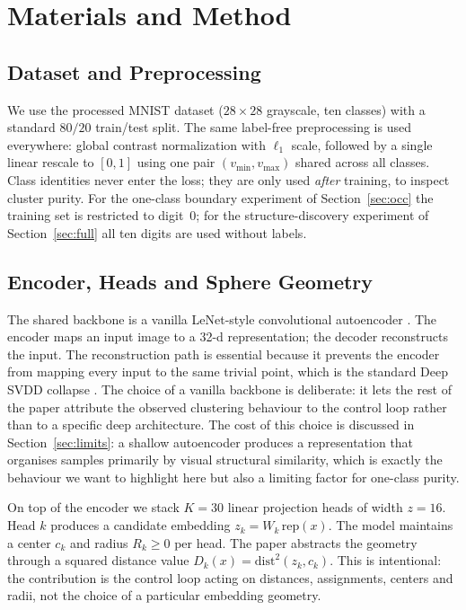 \documentclass[conference]{IEEEtran}
\begin{document}
\section{Materials and Method}

\subsection{Dataset and Preprocessing}
We use the processed MNIST dataset \cite{lecun1998gradient} (\(28\times 28\) grayscale, ten classes) with a standard \(80/20\) train/test split. The same label-free preprocessing is used everywhere: global contrast normalization \cite{coates2011analysis} with \(\ell_{1}\) scale, followed by a single linear rescale to \([0,1]\) using one pair \((v_{\min},v_{\max})\) shared across all classes. Class identities never enter the loss; they are only used \emph{after} training, to inspect cluster purity. For the one-class boundary experiment of Section~\ref{sec:occ} the training set is restricted to digit~0; for the structure-discovery experiment of Section~\ref{sec:full} all ten digits are used without labels.

\subsection{Encoder, Heads and Sphere Geometry}
The shared backbone is a vanilla LeNet-style convolutional autoencoder \cite{lecun1998gradient}. The encoder maps an input image to a 32-d representation; the decoder reconstructs the input. The reconstruction path is essential because it prevents the encoder from mapping every input to the same trivial point, which is the standard Deep SVDD collapse \cite{hojjati2024dasvdd}. The choice of a vanilla backbone is deliberate: it lets the rest of the paper attribute the observed clustering behaviour to the control loop rather than to a specific deep architecture. The cost of this choice is discussed in Section~\ref{sec:limits}: a shallow autoencoder produces a representation that organises samples primarily by visual structural similarity, which is exactly the behaviour we want to highlight here but also a limiting factor for one-class purity.

On top of the encoder we stack \(K=30\) linear projection heads of width \(z=16\). Head \(k\) produces a candidate embedding \(z_{k}=W_{k}\,\mathrm{rep}(x)\). The model maintains a center \(c_{k}\) and radius \(R_{k}\ge 0\) per head. The paper abstracts the geometry through a squared distance value \(D_{k}(x)=\mathrm{dist}^{2}(z_{k},c_{k})\). This is intentional: the contribution is the control loop acting on distances, assignments, centers and radii, not the choice of a particular embedding geometry.
\end{document}
